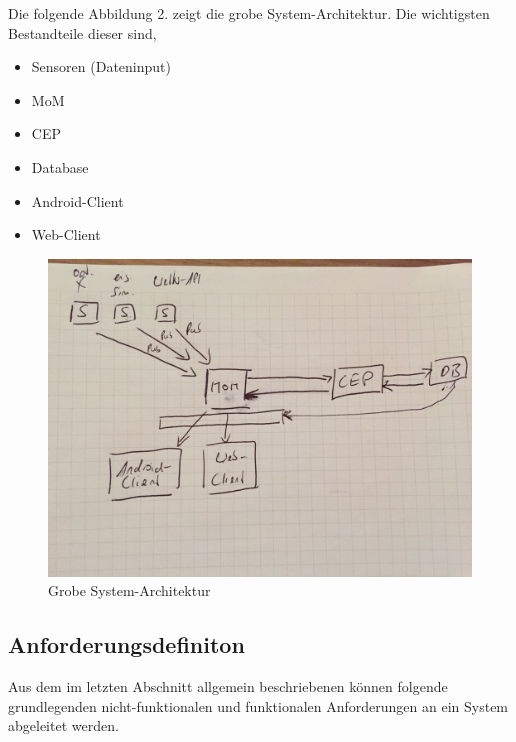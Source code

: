 \documentclass[paper,oneside,onecolumn,notitlepage,bibtotocnumbered,fontsize=12pt,bigheadings,ngerman]{scrartcl}
\begin{document}
Die folgende Abbildung 2. zeigt die grobe System-Architektur. Die wichtigsten Bestandteile dieser sind,
\begin{itemize}
\item Sensoren (Dateninput)
\item MoM
\item CEP
\item Database
\item Android-Client
\item Web-Client
\end{itemize}
\begin{figure}[!ht]
\centering
\includegraphics[width=450pt]{System-Archtitektur.jpeg}
\caption{Grobe System-Architektur}
\end{figure}
\clearpage

\subsection{Anforderungsdefiniton}
Aus dem im letzten Abschnitt allgemein beschriebenen können folgende grundlegenden nicht-funktionalen und funktionalen Anforderungen an ein System abgeleitet werden. 
\end{document}
